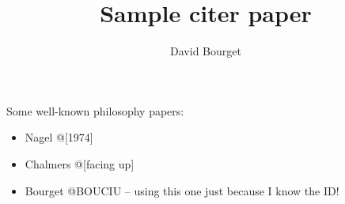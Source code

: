 \documentclass{article}
\begin{document}
\title{Sample citer paper}
\author{David Bourget}

\maketitle

Some well-known philosophy papers:
\begin{itemize}
  \item Nagel @[1974]
  \item Chalmers @[facing up]
  \item Bourget @BOUCIU -- using this one just because I know the ID!
\end{itemize}



\end{document}
